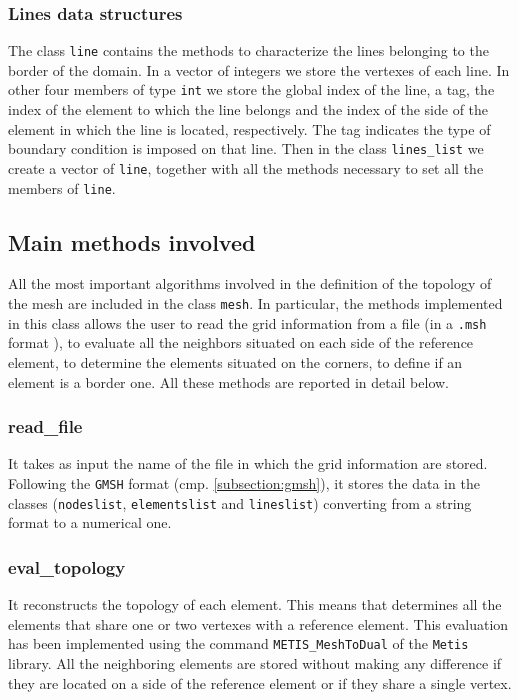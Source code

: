 \subsubsection{Lines data structures}
The class \verb|line| contains the methods to characterize the lines belonging to the border of the domain. In a vector of integers we store the vertexes of each line. In other four members of type \verb|int| we store the global index of the line, a tag, the index of the element to which the line belongs and the index of the side of the element in which the line is located, respectively. The tag indicates the type of boundary condition is imposed on that line. Then in the class \verb|lines_list| we create a vector of \verb|line|, together with all the methods necessary to set all the members of \verb|line|.

\subsection{Main methods involved}\label{subsection:mono_cpu_methods}
All the most important algorithms involved in the definition of the topology of the mesh are included in the class \verb|mesh|. In particular, the methods implemented in this class allows the user to read the grid information from a file (in a \verb|.msh| format ), to evaluate all the neighbors situated on each side of the reference element, to determine the elements situated on the corners, to define if an element is a border one. All these methods are reported in detail below.

\subsubsection{read\_file}
It takes as input the name of the file in which the grid information are stored. Following the \verb|GMSH| format (cmp. \ref{subsection:gmsh}), it stores the data in the classes (\verb|nodeslist|, \verb|elementslist| and \verb|lineslist|) converting from a string format to a numerical one.

\subsubsection{eval\_topology}
It reconstructs the topology of each element. This means that determines all the elements that share one or two vertexes with a reference element. This evaluation has been implemented using the command \verb|METIS_MeshToDual| of the \verb|Metis| library. All the neighboring elements are stored without making any difference if they are located on a side of the reference element or if they share a single vertex.
\medskip

